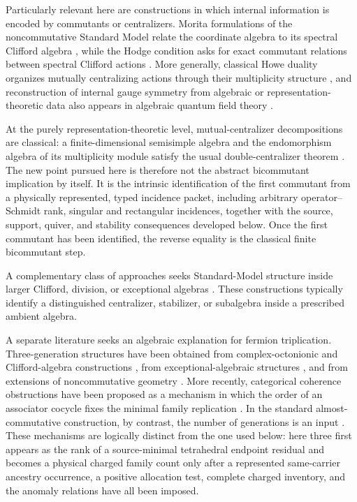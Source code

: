 \documentclass[11pt]{article}
\numberwithin{equation}{section}
\theoremstyle{definition}
\theoremstyle{remark}
\begin{document}
Particularly relevant here are constructions in which internal information is
encoded by commutants or centralizers.  Morita formulations of the
noncommutative Standard Model relate the coordinate algebra to its spectral
Clifford algebra \cite{DAndreaDabrowski2016}, while the Hodge condition asks
for exact commutant relations between spectral Clifford actions
\cite{DabrowskiDAndreaSitarz2018,DabrowskiSitarz2019}.  More generally,
classical Howe duality organizes mutually centralizing actions through their
multiplicity structure \cite{Howe1989}, and reconstruction of internal gauge
symmetry from algebraic or representation-theoretic data also appears in
algebraic quantum field theory
\cite{DoplicherRoberts1989,DoplicherRoberts1990,Todorov2010}.

At the purely representation-theoretic level, mutual-centralizer
decompositions are classical: a finite-dimensional semisimple algebra and
the endomorphism algebra of its multiplicity module satisfy the usual
double-centralizer theorem \cite{EtingofEtAl2011}.  The new point pursued
here is therefore not the abstract bicommutant implication by itself.  It is
the intrinsic identification of the first commutant from a physically
represented, typed incidence packet, including arbitrary operator--Schmidt
rank, singular and rectangular incidences, together with the source, support,
quiver, and stability consequences developed below.  Once the first
commutant has been identified, the reverse equality is the classical finite
bicommutant step.

A complementary class of approaches seeks Standard-Model structure inside
larger Clifford, division, or exceptional algebras
\cite{TraylingBaylis2001,Daviau2017,Gresnigt2020,Krasnov2021,
BaezSchwahn2026,FureyRoadmap2025}.  These constructions typically identify
a distinguished centralizer, stabilizer, or subalgebra inside a prescribed
ambient algebra.

A separate literature seeks an algebraic explanation for fermion
triplication.  Three-generation structures have been obtained from
complex-octonionic and Clifford-algebra constructions
\cite{Furey2018,Gresnigt2026}, from exceptional-algebraic structures
\cite{Baez2026}, and from extensions of noncommutative geometry
\cite{YuMa2018}.  More recently, categorical coherence obstructions have
been proposed as a mechanism in which the order of an associator cocycle
fixes the minimal family replication \cite{Patrascu2026}.  In the standard
almost-commutative construction, by contrast, the number of generations is
an input \cite{ChamseddineConnes2008}.  These mechanisms are logically
distinct from the one used below: here three first appears as the rank of a
source-minimal tetrahedral endpoint residual and becomes a physical charged
family count only after a represented same-carrier ancestry occurrence, a
positive allocation test, complete charged inventory, and the anomaly
relations have all been imposed.
\end{document}
